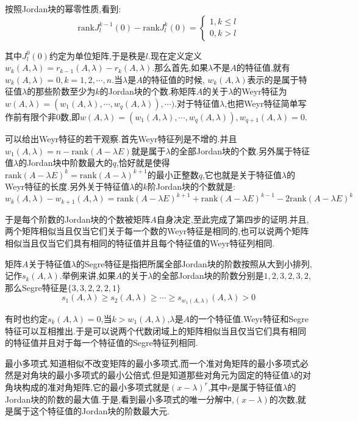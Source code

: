 按照Jordan块的幂零性质,看到:
$$\mathrm{rank}J_l^ {k-1}(0)-\mathrm{rank}J_l^k(0)=\left\{\begin{array}{c}
1,k\le l\\
0,k>l\end{array}\right.$$

其中$J_l^0(0)$约定为单位矩阵,于是秩是$l$.现在定义定义$w_k(A,\lambda)=r_{k-1}(A,\lambda)-r_k(A,\lambda)$.那么首先,如果$\lambda$不是$A$的特征值,就有$w_k(A,\lambda)=0,k=1,2,\cdots,n$.当$\lambda$是$A$的特征值的时候, $w_k(A,\lambda)$表示的是属于特征值$\lambda$的那些阶数至少为$k$的Jordan块的个数.称矩阵$A$的关于$\lambda$的Weyr特征为$w(A,\lambda)=(w_1(A,\lambda),\cdots,w_q(A,\lambda)),\cdots)$.对于特征值$\lambda$,也把Weyr特征简单写作前有限个非0数,即$w(A,\lambda)= (w_1(A,\lambda),\cdots,w_q(A,\lambda)),w_{q+1}(A,\lambda)=0$.

可以给出Weyr特征的若干观察.首先Weyr特征列是不增的.并且$w_1(A,\lambda)=n-\mathrm{rank}(A-\lambda E)$就是属于$\lambda$的全部Jordan块的个数.另外属于特征值$\lambda$的Jordan块中阶数最大的$q$,恰好就是使得$\mathrm{rank}(A-\lambda E)^k=\mathrm{rank}(A-\lambda)^{k+1}$的最小正整数$q$,它也就是关于特征值$\lambda$的Weyr特征的长度.另外关于特征值$\lambda$的$k$阶Jordan块的个数就是:
$$w_k(A,\lambda)-w_{k+1}(A,\lambda)=\mathrm{rank}(A-\lambda E)^{k+1}+\mathrm{rank}(A-\lambda E)^{k-1}-2\mathrm{rank}(A-\lambda E)^{k}$$

于是每个阶数的Jordan块的个数被矩阵$A$自身决定,至此完成了第四步的证明.并且,两个矩阵相似当且仅当它们关于每一个数的Weyr特征是相同的,也可以说两个矩阵相似当且仅当它们具有相同的特征值并且每个特征值的Weyr特征列相同.

矩阵$A$关于特征值$\lambda$的Segre特征是指把所属全部Jordan块的阶数按照从大到小排列,记作$s_k(A,\lambda)$.举例来讲,如果$A$的关于$\lambda$的全部Jordan块的阶数分别是$1,2,3,2,3,2$,那么Segre特征是$\{3,3,2,2,2,1\}$
$$s_1(A,\lambda)\ge s_2(A,\lambda)\ge\cdots\ge s_{w_1(A,\lambda)}(A,\lambda)>0$$

有时也约定$s_k(A,\lambda)=0$,当$k>w_1(A,\lambda)$,$\lambda$是$A$的一个特征值.Weyr特征和Segre特征可以互相推出.于是可以说两个代数闭域上的矩阵相似当且仅当它们具有相同的特征值并且对于每一个特征值的Segre特征列相同.

最小多项式.知道相似不改变矩阵的最小多项式,而一个准对角矩阵的最小多项式必然是对角块的最小多项式的最小公倍式.但是知道那些对角元为固定的特征值$\lambda$的对角块构成的准对角矩阵,它的最小多项式就是$(x-\lambda)^r$,其中$r$是属于特征值$\lambda$的Jordan块的阶数的最大值.于是,看到最小多项式的唯一分解中,$(x-\lambda)$的次数,就是属于这个特征值的Jordan块的阶数最大元.

